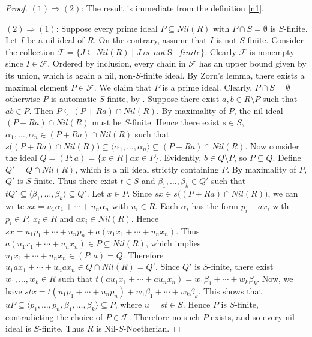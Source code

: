 \documentclass[11pt]{article}
\begin{document}
\begin{proof}
$(1) \Rightarrow (2)$:  The result is immediate from the definition \ref{n1}.


\noindent
$(2) \Rightarrow (1)$:  
Suppose every prime ideal $P \subseteq Nil(R)$ with $P \cap S = \emptyset$ is $S$-finite. Let $I$ be a nil ideal of $R$. On the contrary, assume that $I$ is not $S$-finite. Consider the collection $\mathcal{F} = \{J \subseteq Nil(R) \mid J~is~ ~not~$S$-finite \}$. Clearly $\mathcal{F}$ is nonempty since $I \in \mathcal{F}$. Ordered by inclusion, every chain in $\mathcal{F}$ has an upper bound given by its union, which is again a nil, non-$S$-finite ideal. By Zorn's lemma, there exists a maximal element $P\in \mathcal{F}$. We claim that $P$ is a prime ideal. Clearly, $P\cap S=\emptyset$ otherwise $P$ is automatic $S$-finite, by \cite[Proposition 2(a)]{ad02}. Suppose there exist $a, b \in R \setminus P$ such that $ab \in P$. Then $P \subsetneq (P+Ra)\cap Nil(R)$. By maximality of $P$, the nil ideal $(P+Ra)\cap Nil(R)$ must be $S$-finite. Hence there exist $s \in S$, $\alpha_{1},\ldots, \alpha_{n} \in (P+Ra)\cap Nil(R)$ such that $s\big((P+Ra)\cap Nil(R)\big) \subseteq \langle \alpha_{1},\ldots,\alpha_{n} \rangle \subseteq (P+Ra)\cap Nil(R)$. Now consider the ideal $Q=(P:a)=\{x\in R\mid ax\in P\}$. Evidently, $b \in Q \setminus P$, so $P \subsetneq Q$. Define $Q' = Q \cap Nil(R)$, which is a nil ideal strictly containing $P$. By maximality of $P$, $Q'$ is $S$-finite. Thus there exist $t\in S$ and $\beta_{1},\ldots,\beta_{k}\in Q'$ such that $tQ' \subseteq \langle \beta_{1},\ldots,\beta_{k}\rangle \subseteq Q'$. Let $x \in P$. Since $sx\in s\big((P+Ra)\cap Nil(R)\big)$, we can write $sx = u_{1}\alpha_{1} + \cdots + u_{n}\alpha_{n}$ with $u_{i}\in R$. Each $\alpha_{i}$ has the form $p_{i} + ax_{i}$ with $p_{i}\in P$, $x_{i}\in R$ and $ax_{i}\in Nil(R)$. Hence $sx = u_{1}p_{1} + \cdots + u_{n}p_{n} + a(u_{1}x_{1} + \cdots + u_{n}x_{n})$. Thus $a(u_{1}x_{1}+\cdots+u_{n}x_{n}) \in P\subseteq Nil(R)$, which implies $u_{1}x_{1}+\cdots+u_{n}x_{n} \in (P:a)=Q$.  Therefore $u_{1}ax_{1}+\cdots+u_{n}ax_{n}\in Q\cap Nil(R)=Q'$. Since $Q'$ is $S$-finite, there exist $w_{1},\ldots,w_{k}\in R$ such that $t(au_{1}x_{1}+\cdots+au_{n}x_{n}) = w_{1}\beta_{1} + \cdots + w_{k}\beta_{k}$. Now, we have $stx = t(u_{1}p_{1}+\cdots+u_{n}p_{n}) + w_{1}\beta_{1}+\cdots+w_{k}\beta_{k}$. This shows that
$uP \subseteq \langle p_{1},\ldots,p_{n},\beta_{1},\ldots, \beta_{k} \rangle \subseteq P$, where $u=st\in S$. Hence $P$ is $S$-finite, contradicting the choice of $P \in \mathcal{F}$. Therefore no such $P$ exists, and so every nil ideal is $S$-finite. Thus $R$ is Nil-$S$-Noetherian.
\end{proof}
\end{document}
